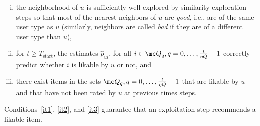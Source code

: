\documentclass{article}
\newcommand{\setQ}{\mc Q}
\begin{document}
\begin{enumerate}[i)]

\item \label{it1} the neighborhood of $u$ is sufficiently well explored by similarity exploration steps so that most of the nearest neighbors of $u$ are \emph{good}, i.e., are of the same user type as $u$ (similarly, neighbors are called \emph{bad} if they are of a different user type than $u$), 

\item \label{it2} for $t\geq T_{\text{start}}$, the estimates $\hat p_{ui}$, for all $i \in \setQ_q, q=0,\ldots,\frac{t}{\eta Q}-1$ correctly predict whether $i$ is likable by $u$ or not, and 

\item \label{it3}  there exist items in the sets $\setQ_q, q=0,\ldots,\frac{t}{\eta Q}-1$ that are likable by $u$ and that have not been rated by $u$ at previous times steps. 

\end{enumerate}
Conditions~\ref{it1}, \ref{it2}, and \ref{it3} guarantee that an exploitation step recommends a likable item. 
\end{document}
